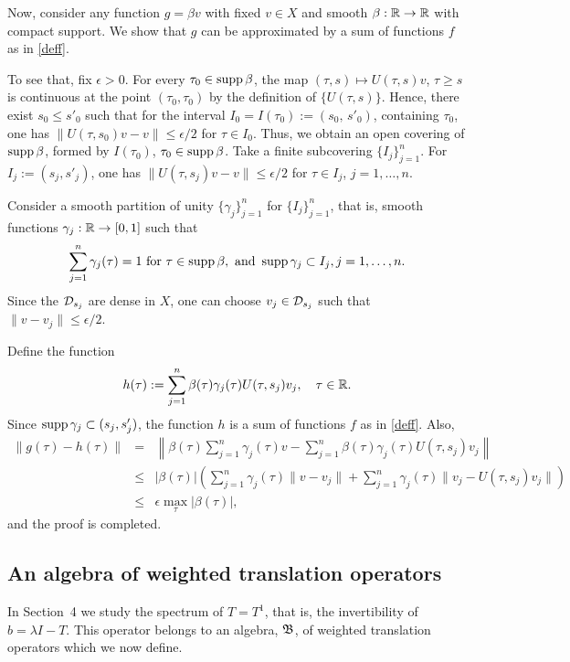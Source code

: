 \begin{exmp}
\begin{pf}
Now, consider any function $g=\beta v$ with fixed
$v\in X$ and smooth $\beta:{\Bbb{R}}\to{\Bbb{R}}$ with compact support.
We show that $g$ can be
approximated by a sum of functions $f$ as in \eqref{deff}.

To see that, fix $\epsilon>0$. For every $\tau_0\in\operatorname{supp}\beta$,
the map $(\tau,s)\mapsto U(\tau,s)v$, $\tau\ge s$ is continuous at
the point $(\tau_0,\tau_0)$ by the definition of $\{U(\tau,s)\}$.
Hence, there exist $s_0\le s'_0$ such that for the interval $I_0=I(\tau_0)
:=(s_0,\, s'_0)$, containing $\tau_0$, one has
$\|U(\tau,s_0)v-v\|\le\epsilon/2$ for  $\tau\in I_0$.
Thus, we obtain an open covering of
$\operatorname{supp}\beta$, formed by $I(\tau_0)$, $\tau_0\in\operatorname{supp}\beta$.
Take a finite subcovering $\{I_j\}_{j=1}^n$.  For
$I_j:=(s_j,s'_j)$, one has  $\|U(\tau,s_j)v-v\|\le\epsilon/2$ for
 $\tau\in I_j$, $j=1,\dots, n$.

Consider a smooth partition of
unity $\{\gamma_j\}_{j=1}^n$ for $\{I_j\}_{j=1}^n$, that is, smooth
functions $\gamma_j:{\Bbb{R}}\to [0,1]$ such that
\[ \sum\limits_{j=1}^n \gamma_j(\tau)=1 \mbox{ for }
\tau\in\operatorname{supp}\beta, \mbox{ and } \operatorname{supp}\gamma_j\subset I_j, j=1,\dots, n.\]
Since the ${\cal{D}}_{s_j}$ are dense in $X$, one can choose
$v_j\in{\cal{D}}_{s_j}$ such that
$\|v-v_j\|\le\epsilon/2$.

Define the function
\[ h(\tau):=\sum_{j=1}^n \beta (\tau) \gamma_j(\tau) U(\tau,
s_j)v_j,\quad \tau\in{\Bbb{R}}.\]
Since $\operatorname{supp}\gamma_j\subset (s_j,s'_j)$, the function $h$ is a sum
of functions $f$ as in \eqref{deff}.
Also,
\begin{eqnarray*}
\|g(\tau)-h(\tau)\|& = &\left\|
\beta (\tau) \sum_{j=1}^n \gamma_j(\tau) v-
\sum_{j=1}^n \beta (\tau) \gamma_j(\tau) U(\tau,
s_j)v_j\right\| \\
&\le&
|\beta(\tau)|
\left(\sum_{j=1}^n\gamma_j(\tau)\| v-v_j\| +
\sum_{j=1}^n\gamma_j(\tau)\|
v_j-U(\tau,s_j)v_j\|\right)\\
& \le &\epsilon\max_\tau|\beta(\tau)|, \end{eqnarray*}
and the proof is completed.
\end{pf}
\end{exmp}

\subsection{An algebra of weighted translation operators}

In Section~4 we study the spectrum of $T=T^1$, that is, the
invertibility of $b=\lambda I-T$. This operator belongs to an
algebra, ${\frak{B}}$, of weighted translation operators which we now
define.

